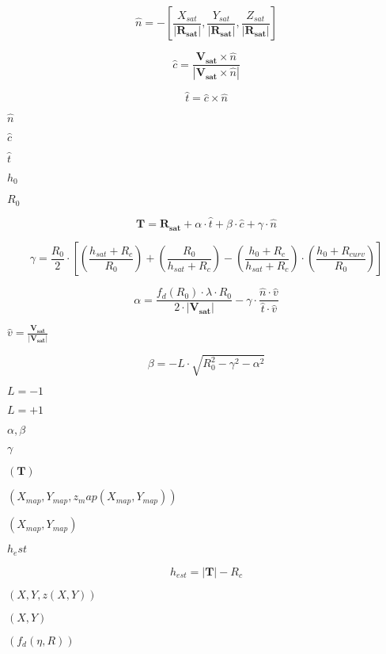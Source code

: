 \documentclass{article}
\begin{document}
\[ \hat{n} = -\left[ \frac{X_{sat}}{\left| \mathbf{R_{sat}} \right|}, \frac{Y_{sat}}{\left| \mathbf{R_{sat}} \right|}, \frac{Z_{sat}}{\left| \mathbf{R_{sat}} \right|} \right] \]
\pagebreak

\[ \hat{c} = \frac{\mathbf{V_{sat}} \times \hat{n}}{\left| \mathbf{V_{sat}} \times \hat{n} \right| } \]
\pagebreak

\[ \hat{t} = \hat{c} \times \hat{n} \]
\pagebreak

$\hat{n}$
\pagebreak

$\hat{c}$
\pagebreak

$\hat{t}$
\pagebreak

$h_0$
\pagebreak

$R_0$
\pagebreak

\[ \mathbf{T} = \mathbf{R_{sat}} + \alpha \cdot \hat{t} + \beta \cdot \hat{c} + \gamma \cdot \hat{n} \]
\pagebreak

\[ \gamma = \frac{R_0}{2} \cdot \left[ \left( \frac{h_{sat} + R_c}{R_0}\right) + \left( \frac{R_0}{h_{sat} + R_c } \right) - \left( \frac{h_0 + R_c}{h_{sat}+R_c} \right) \cdot \left( \frac{h_0 + R_{curv}}{R_0} \right) \right] \]
\pagebreak

\[ \alpha = \frac{f_d\left(R_0\right) \cdot \lambda \cdot R_0}{2 \cdot \left| \mathbf{V_{sat}} \right|} - \gamma \cdot \frac{\hat{n} \cdot \hat{v}}{\hat{t} \cdot \hat{v}} \]
\pagebreak

$\hat{v} = \frac{\mathbf{V_{sat}}}{\left| \mathbf{V_{sat}} \right|}$
\pagebreak

\[ \beta = -L\cdot \sqrt{R_0^2 - \gamma^2 - \alpha^2} \]
\pagebreak

$L=-1$
\pagebreak

$L=+1$
\pagebreak

$ \alpha, \beta$
\pagebreak

$\gamma$
\pagebreak

$\left( \mathbf{T} \right)$
\pagebreak

$\left( X_{map}, Y_{map}, z_map\left(X_{map}, Y_{map}\right) \right)$
\pagebreak

$\left(X_{map}, Y_{map}\right)$
\pagebreak

$h_est$
\pagebreak

\[ h_{est} = \left| \mathbf{T} \right| - R_c \]
\pagebreak

$\left (X,Y, z\left(X,Y\right)\right)$
\pagebreak

$\left(X,Y\right)$
\pagebreak

$\left(f_d \left(\eta,R\right)\right)$
\pagebreak
\end{document}
